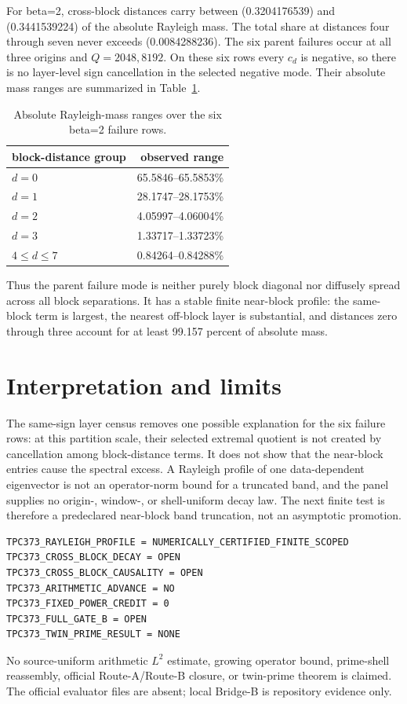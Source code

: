 \documentclass[10pt]{article}
\begin{document}
For beta=2, cross-block distances carry between
(0.3204176539) and (0.3441539224) of the absolute Rayleigh mass.  The
total share at distances four through seven never exceeds
(0.0084288236).  The six parent failures occur at all three origins and
\(Q=2048,8192\).  On these six rows every \(c_d\) is negative, so there is no
layer-level sign cancellation in the selected negative mode.  Their absolute
mass ranges are summarized in Table~\ref{tab:layers}.

\begin{table}[h]
\centering
\caption{Absolute Rayleigh-mass ranges over the six beta=2 failure rows.}
\label{tab:layers}
\begin{tabular}{@{}lr@{}}
\toprule
block-distance group & observed range\\
\midrule
\(d=0\) & 65.5846--65.5853\%\\
\(d=1\) & 28.1747--28.1753\%\\
\(d=2\) & 4.05997--4.06004\%\\
\(d=3\) & 1.33717--1.33723\%\\
\(4\leq d\leq7\) & 0.84264--0.84288\%\\
\bottomrule
\end{tabular}
\end{table}

Thus the parent failure mode is neither purely block diagonal nor diffusely
spread across all block separations.  It has a stable finite near-block
profile: the same-block term is largest, the nearest off-block layer is
substantial, and distances zero through three account for at least 99.157
percent of absolute mass.

\section{Interpretation and limits}

The same-sign layer census removes one possible explanation for the six
failure rows: at this partition scale, their selected extremal quotient is
not created by cancellation among block-distance terms.  It does not show
that the near-block entries cause the spectral excess.  A Rayleigh profile of
one data-dependent eigenvector is not an operator-norm bound for a truncated
band, and the panel supplies no origin-, window-, or shell-uniform decay law.
The next finite test is therefore a predeclared near-block band truncation,
not an asymptotic promotion.

\begin{verbatim}
TPC373_RAYLEIGH_PROFILE = NUMERICALLY_CERTIFIED_FINITE_SCOPED
TPC373_CROSS_BLOCK_DECAY = OPEN
TPC373_CROSS_BLOCK_CAUSALITY = OPEN
TPC373_ARITHMETIC_ADVANCE = NO
TPC373_FIXED_POWER_CREDIT = 0
TPC373_FULL_GATE_B = OPEN
TPC373_TWIN_PRIME_RESULT = NONE
\end{verbatim}

No source-uniform arithmetic \(L^2\) estimate, growing operator bound,
prime-shell reassembly, official Route-A/Route-B closure, or twin-prime
theorem is claimed.  The official evaluator files are absent; local Bridge-B
is repository evidence only.
\end{document}
